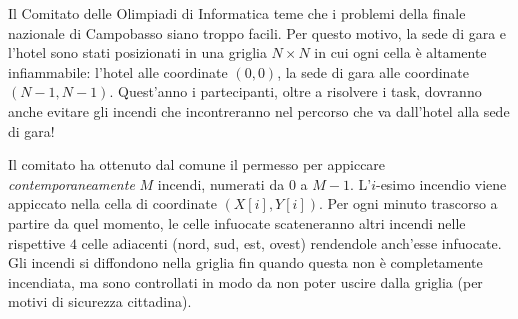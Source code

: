 \usepackage{xcolor}
\usepackage{afterpage}
\usepackage{pifont,mdframed}
\usepackage[bottom]{footmisc}
\usepackage[labelformat=empty]{caption}


\renewcommand{\inputfile}{\texttt{stdin}}
\renewcommand{\outputfile}{\texttt{stdout}}
\makeatletter
\renewcommand{\this@inputfilename}{\texttt{stdin}}
\renewcommand{\this@outputfilename}{\texttt{stdout}}
\makeatother

\newenvironment{warning}
  {\par\begin{mdframed}[linewidth=2pt,linecolor=gray]%
    \begin{list}{}{\leftmargin=1cm
                   \labelwidth=\leftmargin}\item[\Large\ding{43}]}
  {\end{list}\end{mdframed}\par}
\newenvironment{danger}
{\par\begin{mdframed}[linewidth=2pt,linecolor=red!60!yellow,backgroundcolor=red!20!white]%
		\begin{list}{}{\leftmargin=1cm
				\labelwidth=\leftmargin}\item[\Large\ding{45}]}
		{\end{list}\end{mdframed}\par}


Il Comitato delle Olimpiadi di Informatica teme che i problemi della finale nazionale di Campobasso siano troppo facili. Per questo motivo, la sede di gara e l'hotel sono stati posizionati in una griglia $N \times N$ in cui ogni cella è altamente infiammabile: l'hotel alle coordinate $(0,0)$, la sede di gara alle coordinate $(N-1, N-1)$. Quest'anno i partecipanti, oltre a risolvere i task, dovranno anche evitare gli incendi che incontreranno nel percorso che va dall'hotel alla sede di gara!

Il comitato ha ottenuto dal comune il permesso per appiccare \emph{contemporaneamente} $M$ incendi, numerati da $0$ a $M-1$. L'$i$-esimo incendio viene appiccato nella cella di coordinate $(X[i], Y[i])$. Per ogni minuto trascorso a partire da quel momento, le celle infuocate scateneranno altri incendi nelle rispettive $4$ celle adiacenti (nord, sud, est, ovest) rendendole anch'esse infuocate.
Gli incendi si diffondono nella griglia fin quando questa non è completamente incendiata, ma sono controllati in modo da non poter uscire dalla griglia (per motivi di sicurezza cittadina).

